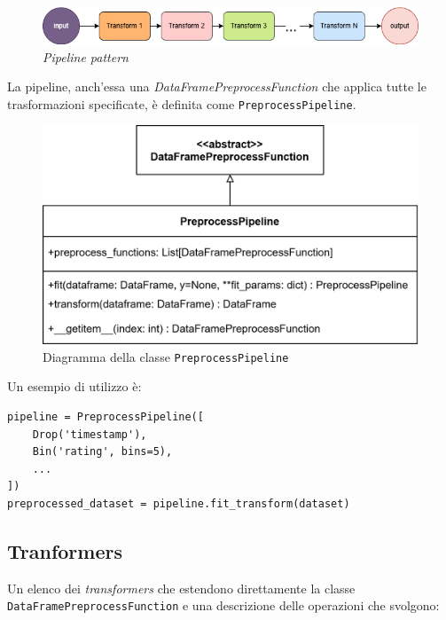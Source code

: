 \begin{figure}[H]
    \centering
    \includegraphics[scale=0.45]{figures/pipeline.png}
    \caption{\textit{Pipeline pattern}}
    \label{fig:pipeline}
\end{figure}

La pipeline, anch'essa una \textit{DataFramePreprocessFunction} che applica tutte le trasformazioni specificate, è definita come \texttt{PreprocessPipeline}.

\begin{figure}[H]
    \centering
    \includegraphics[scale=0.2]{figures/UML/preprocessing/preprocess_pipeline.png}
    \caption{Diagramma della classe \texttt{PreprocessPipeline}}
    \label{fig:preprocess_pipeline}
\end{figure}

Un esempio di utilizzo è:

\begin{lstlisting}[caption=esempio di utilizzo di \texttt{PreprocessPipeline}]
pipeline = PreprocessPipeline([
    Drop('timestamp'),
    Bin('rating', bins=5),
    ...
])
preprocessed_dataset = pipeline.fit_transform(dataset) 
\end{lstlisting}

\subsection{Tranformers}

Un elenco dei \textit{transformers} che estendono direttamente la classe \texttt{DataFramePreprocessFunction} e una descrizione delle operazioni che svolgono:

